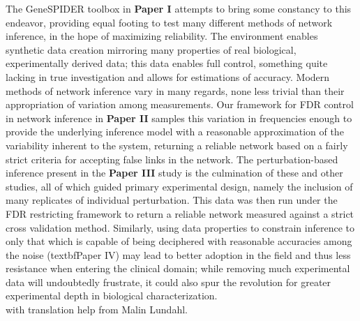 The GeneSPIDER toolbox in \textbf{Paper I} attempts to bring some constancy to this endeavor, providing equal footing to test many different methods of network inference, in the hope of maximizing reliability. The environment enables synthetic data creation mirroring many properties of real biological, experimentally derived data; this data enables full control, something quite lacking in true investigation and allows for estimations of accuracy. Modern methods of network inference vary in many regards, none less trivial than their appropriation of variation among measurements. Our framework for FDR control in network inference in \textbf{Paper II} samples this variation in frequencies enough to provide the underlying inference model with a reasonable approximation of the variability inherent to the system, returning a reliable network based on a fairly strict criteria for accepting false links in the network. The perturbation-based inference present in the \textbf{Paper III} study is the culmination of these and other studies, all of which guided primary experimental design, namely the inclusion of many replicates of individual perturbation. This data was then run under the FDR restricting framework to return a reliable network measured against a strict cross validation method. Similarly, using data properties to constrain inference to only that which is capable of being deciphered with reasonable accuracies among the noise (textbf{Paper IV}) may lead to better adoption in the field and thus less resistance when entering the clinical domain; while removing much experimental data will undoubtedly frustrate, it could also spur the revolution for greater experimental depth in biological characterization.%
\\


with translation help from Malin Lundahl.





